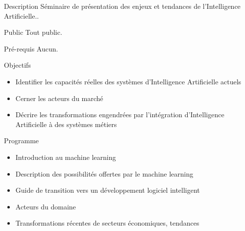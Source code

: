 \begin{frame}{Description}
  Séminaire de présentation des enjeux et tendances de l'Intelligence Artificielle..
\end{frame}

\begin{frame}{Public}
  Tout public.
\end{frame}

\begin{frame}{Pré-requis}
  Aucun.
\end{frame}

\begin{frame}{Objectifs}
  \begin{itemize}
    \item Identifier les capacités réelles des systèmes d'Intelligence Artificielle actuels
    \item Cerner les acteurs du marché
    \item Décrire les transformations engendrées par l'intégration d'Intelligence Artificielle à des systèmes métiers
  \end{itemize}
\end{frame}

\begin{frame}{Programme}
  \begin{itemize}
  \item Introduction au machine learning
  \item Description des possibilités offertes par le machine learning 
  \item Guide de transition vers un développement logiciel intelligent
  \item Acteurs du domaine
  \item Transformations récentes de secteurs économiques, tendances
  \end{itemize}
\end{frame}
